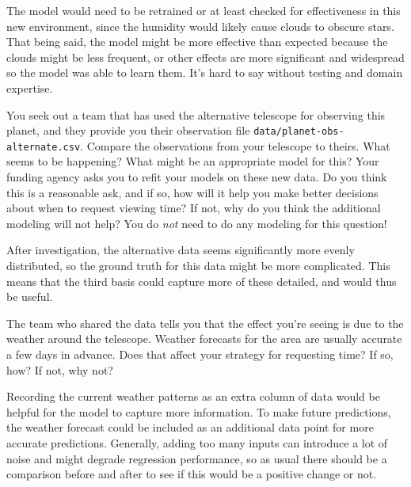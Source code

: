 \documentclass[expanded]{lkx_pset}
\begin{document}
\begin{parts}
\begin{parts}
		The model would need to be retrained or at least checked for effectiveness in this new environment, since the humidity would likely cause clouds to obscure stars. That being said, the model might be more effective than expected because the clouds might be less frequent, or other effects are more significant and widespread so the model was able to learn them. It's hard to say without testing and domain expertise.

		\begin{part}{}
			You seek out a team that has used the alternative telescope
			for observing this planet, and they provide you their observation
			file \verb|data/planet-obs-alternate.csv|.
			Compare the observations from your telescope to theirs.  What
			seems to be happening?  What might be an appropriate model for
			this? Your funding agency asks you to refit your models on these
			new data.  Do you think this is a reasonable ask, and if so, how
			will it help you make better decisions about when to request
			viewing time?  If not, why do you think the additional modeling
			will not help? You do \emph{not} need to do any modeling for this
			question!
		\end{part}

		After investigation, the alternative data seems significantly more evenly distributed, so the ground truth for this data might be more complicated. This means that the third basis could capture more of these detailed, and would thus be useful.

		\begin{part}{}
			The team who shared the data tells you that the effect you're
			seeing is due to the weather around the telescope.  Weather
			forecasts for the area are usually accurate a few days in
			advance. Does that affect your strategy for requesting time?  If
			so, how?  If not, why not?
		\end{part}

		Recording the current weather patterns as an extra column of data would be helpful for the model to capture more information. To make future predictions, the weather forecast could be included as an additional data point for more accurate predictions. Generally, adding too many inputs can introduce a lot of noise and might degrade regression performance, so as usual there should be a comparison before and after to see if this would be a positive change or not.
	\end{parts}
\end{parts}
\end{document}
